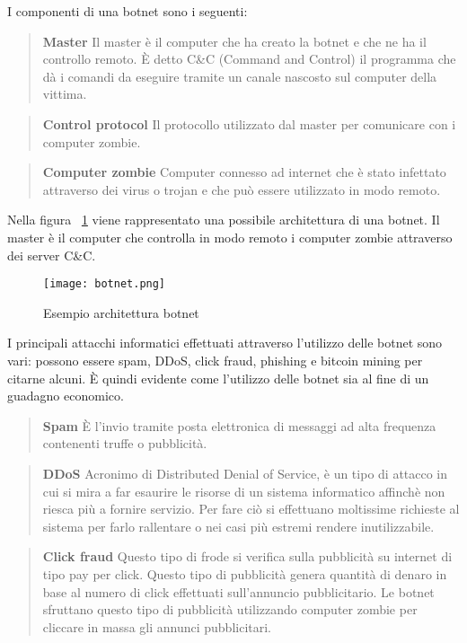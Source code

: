 \documentclass[../main.tex]{subfiles}
\begin{document}
I componenti di una botnet sono i seguenti:

\begin{verse}
				\textbf{Master} Il master è il computer che ha creato la botnet e che ne ha il controllo remoto. È detto C\&C (Command and Control) il programma che dà i comandi da eseguire tramite un canale nascosto sul computer della vittima.
\end{verse}

\begin{verse}
				\textbf{Control protocol} Il protocollo utilizzato dal master per comunicare con i computer zombie.
\end{verse}

\begin{verse}
				\textbf{Computer zombie} Computer connesso ad internet che è stato infettato attraverso dei virus o trojan e che può essere utilizzato in modo remoto. 
\end{verse}

Nella figura ~\ref{fig:architetturaBotnet} viene rappresentato una possibile architettura di una botnet. Il master è il computer che controlla in modo remoto i computer zombie attraverso dei server C\&C.
\begin{figure}[H]
				\centering
				\texttt{[image: botnet.png]}
				\caption{Esempio architettura botnet}
				\label{fig:architetturaBotnet}
\end{figure}

I principali attacchi informatici effettuati attraverso l'utilizzo delle botnet sono vari: possono essere spam, DDoS, click fraud, phishing e bitcoin mining per citarne alcuni. È quindi evidente come l'utilizzo delle botnet sia al fine di un guadagno economico.

\begin{verse}
				\textbf{Spam} È l'invio tramite posta elettronica di messaggi ad alta frequenza contenenti truffe o pubblicità.
\end{verse}

\begin{verse}
				\textbf{DDoS} Acronimo di Distributed Denial of Service, è un tipo di attacco in cui si mira a far esaurire le risorse di un sistema informatico affinchè non riesca più a fornire servizio. Per fare ciò si effettuano moltissime richieste al sistema per farlo rallentare o nei casi più estremi rendere inutilizzabile.
\end{verse}

\begin{verse}
				\textbf{Click fraud} Questo tipo di frode si verifica sulla pubblicità su internet di tipo pay per click. Questo tipo di pubblicità genera quantità di denaro in base al numero di click effettuati sull'annuncio pubblicitario. Le botnet sfruttano questo tipo di pubblicità utilizzando computer zombie per cliccare in massa gli annunci pubblicitari.
\end{verse}
\end{document}
